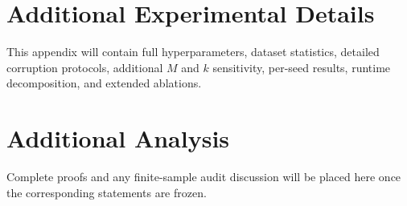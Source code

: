 \section{Additional Experimental Details}
\label{app:details}
This appendix will contain full hyperparameters, dataset statistics, detailed corruption protocols, additional $M$ and $k$ sensitivity, per-seed results, runtime decomposition, and extended ablations.

\section{Additional Analysis}
\label{app:analysis}
Complete proofs and any finite-sample audit discussion will be placed here once the corresponding statements are frozen.
